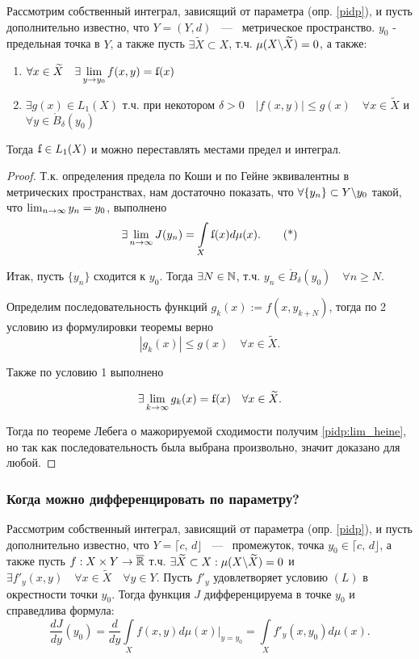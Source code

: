 \theorem Рассмотрим собственный интеграл, зависящий от параметра (опр. \ref{pidp}), и пусть дополнительно известно, что $Y = (Y, d)$ ~---~ метрическое пространство. $y_0$ - предельная точка в $Y$, а также пусть $\exists \widetilde{X} \subset X$, т.ч. $\mu(X \backslash \widetilde{X}) = 0$, а также:
\begin{enumerate}
    \item $\forall x \in \widetilde{X} \quad \exists \lim\limits_{y \ra y_0} f(x, y) = \ff(x)$
    \item $\exists g(x) \in L_1(X)$ т.ч. при некотором $\delta > 0 \quad \left| f(x,y)\right| \leq g(x) \quad \forall x \in \widetilde{X}$ и $\forall y \in \mathring{B}_\delta(y_0)$
\end{enumerate}


Тогда $\ff \in L_1(X)$ и можно переставлять местами предел и интеграл.

\begin{proof}
	Т.к. определения предела по Коши и по Гейне эквивалентны в метрических пространствах, нам достаточно показать, что $\forall \{y_n\} \subset Y \backslash y_0$ такой, что $\lim_{n \rightarrow \infty} y_n = y_0$, выполнено \[
	\exists \lim\limits_{n \ra \infty} J(y_n) = \int\limits_{X} \ff(x) d\mu(x). \tag{*}
	\label{pidp:lim_heine}
	\]

	Итак, пусть $\{y_n\}$ сходится к $y_0$. Тогда $\exists N \in \mathbb{N}$, т.ч. $y_n \in \mathring{B}_\delta(y_0) \quad \forall n \geq N$.

	Определим последовательность функций $g_k(x) := f(x, y_{k + N})$, тогда по 2 условию из формулировки теоремы верно
	$$\left| g_k(x) \right| \leq g(x) \quad \forall x \in \widetilde{X}.$$

	Также по условию 1 выполнено

	$$\exists \lim\limits_{k \ra \infty}g_k(x) = \ff(x) \quad \forall x \in \widetilde{X}.$$

	Тогда по теореме Лебега о мажорируемой сходимости получим \eqref{pidp:lim_heine}, но так как последовательность была выбрана произвольно, значит доказано для любой.
\end{proof}

\subsubsection{Когда можно дифференцировать по параметру?}

\theorem Рассмотрим собственный интеграл, зависящий от параметра (опр. \ref{pidp}), и пусть дополнительно известно, что $Y = \lceil c, \, d\rfloor$ ~---~ промежуток, точка $y_0 \in \lceil c, \, d\rfloor$, а также пусть $f : X \times Y \rightarrow \overline{\mathbb{R}}$ т.ч. $\exists \widetilde{X} \subset X : \mu(X \backslash \widetilde{X}) = 0$ и $\exists f'_y(x, y) \quad \forall x \in \widetilde{X} \quad \forall y \in Y$. Пусть $f'_y$ удовлетворяет условию $(L)$ в окрестности точки $y_0$. Тогда функция $J$ дифференцируема в точке $y_0$ и справедлива формула:
$$\frac{d J}{d y}(y_0) = \frac{d}{d y} \int\limits_X f(x, y) d \mu(x) \Bigg|_{y=y_0} = \int\limits_X f'_y(x, y_0) d \mu(x).$$

